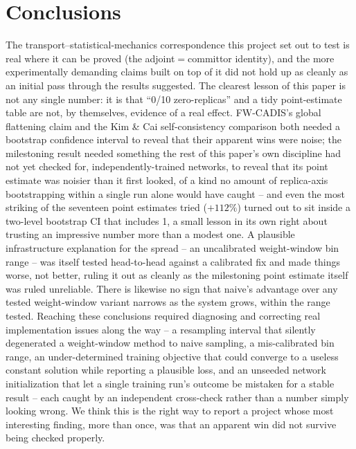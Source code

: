 \documentclass[a4paper,fleqn]{cas-sc}
\begin{document}
\section{Conclusions}\label{sec:conclusions}
The transport--statistical-mechanics correspondence this project set out to test is real
where it can be proved (the adjoint$=$committor identity), and the more experimentally
demanding claims built on top of it did not hold up as cleanly as an initial pass through
the results suggested. The clearest lesson of this paper is not any single number: it is
that ``0/10 zero-replicas'' and a tidy point-estimate table are not, by themselves, evidence
of a real effect. FW-CADIS's global flattening claim and the Kim \& Cai self-consistency
comparison both needed a bootstrap confidence interval to reveal that their apparent wins
were noise; the milestoning result needed something the rest of this paper's own
discipline had not yet checked for, independently-trained networks, to reveal that its
point estimate was noisier than it first looked, of a kind no amount of replica-axis
bootstrapping within a single run alone would have caught -- and even the most striking
of the seventeen point estimates tried ($+112\%$) turned out to sit inside a two-level
bootstrap CI that includes 1, a small lesson in its own right about trusting an
impressive number more than a modest one. A plausible infrastructure explanation for the
spread -- an uncalibrated weight-window bin range -- was itself tested head-to-head
against a calibrated fix and made things worse, not better, ruling it out as cleanly as
the milestoning point estimate itself was ruled unreliable. There is likewise no sign that naive's
advantage over any tested weight-window variant narrows as the system grows, within the
range tested. Reaching these conclusions required diagnosing and correcting real
implementation issues along the way -- a resampling interval that silently degenerated a
weight-window method to naive sampling, a mis-calibrated bin range, an under-determined
training objective that could converge to a useless constant solution while reporting a
plausible loss, and an unseeded network initialization that let a single training run's
outcome be mistaken for a stable result -- each caught by an independent cross-check
rather than a number simply looking wrong. We think this is the right way to report a
project whose most interesting finding, more than once, was that an apparent win did not
survive being checked properly.

\end{document}
